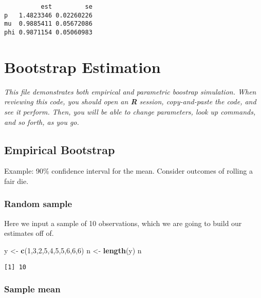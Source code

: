 \documentclass[]{book}
\newenvironment{Shaded}{\begin{snugshade}}{\end{snugshade}}
\newcommand{\KeywordTok}[1]{\textcolor[rgb]{0.13,0.29,0.53}{\textbf{#1}}}
\newcommand{\DecValTok}[1]{\textcolor[rgb]{0.00,0.00,0.81}{#1}}
\newcommand{\StringTok}[1]{\textcolor[rgb]{0.31,0.60,0.02}{#1}}
\newcommand{\NormalTok}[1]{#1}
\theoremstyle{definition}
\theoremstyle{definition}
\theoremstyle{definition}
\theoremstyle{remark}
\begin{document}
\begin{verbatim}
          est         se
p   1.4823346 0.02260226
mu  0.9885411 0.05672086
phi 0.9871154 0.05060983
\end{verbatim}

\chapter{Bootstrap Estimation}\label{bootstrap-estimation}

\emph{This file demonstrates both empirical and parametric boostrap
simulation. When reviewing this code, you should open an \textbf{R}
session, copy-and-paste the code, and see it perform. Then, you will be
able to change parameters, look up commands, and so forth, as you go.}

\section{Empirical Bootstrap}\label{empirical-bootstrap}

Example: 90\% confidence interval for the mean. Consider outcomes of
rolling a fair die.

\subsection{Random sample}\label{random-sample}

Here we input a sample of 10 observations, which we are going to build
our estimates off of.

\begin{Shaded}
\begin{Highlighting}[]
\NormalTok{y <-}\StringTok{ }\KeywordTok{c}\NormalTok{(}\DecValTok{1}\NormalTok{,}\DecValTok{3}\NormalTok{,}\DecValTok{2}\NormalTok{,}\DecValTok{5}\NormalTok{,}\DecValTok{4}\NormalTok{,}\DecValTok{5}\NormalTok{,}\DecValTok{5}\NormalTok{,}\DecValTok{6}\NormalTok{,}\DecValTok{6}\NormalTok{,}\DecValTok{6}\NormalTok{)}
\NormalTok{n <-}\StringTok{ }\KeywordTok{length}\NormalTok{(y)}
\NormalTok{n}
\end{Highlighting}
\end{Shaded}

\begin{verbatim}
[1] 10
\end{verbatim}

\subsection{Sample mean}\label{sample-mean}
\end{document}
